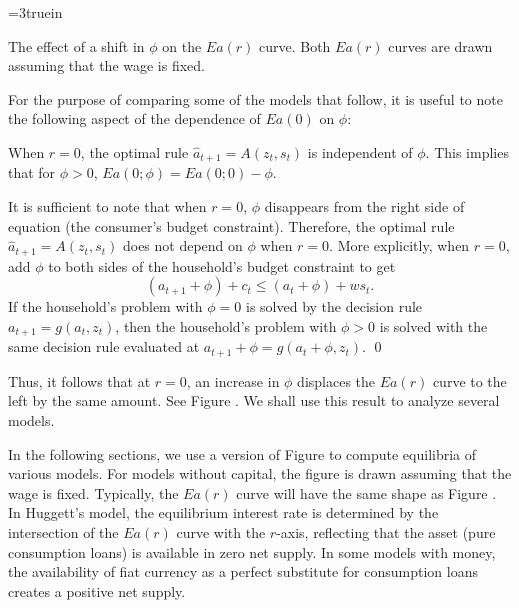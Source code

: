 \medskip


\centerline{\epsfxsize=3truein}
\caption{The effect of a shift in $\phi$ on the $E a(r)$ curve.  Both $E a(r)$
curves are drawn assuming that the wage is fixed.}
\endfigure


For the purpose of comparing some of the models that follow, it is useful to note
the following aspect of the dependence of
$E a(0)$ on $\phi$:

\medskip
\medskip{} When $r=0$, the optimal rule
$ \hat a_{t+1} = A(z_t,s_t)$
is independent of $\phi$.  This implies that for $\phi >0$, $E a(0;\phi)
   = Ea(0; 0) - \phi$.

\medskip
{}  It is sufficient to note that
when $r=0$, $\phi$ disappears  from the right side of equation
 (the consumer's budget constraint).
  Therefore, the optimal rule
$\hat a_{t+1} = A(z_t,s_t)$ does not depend on $\phi$ when
$r=0$.  More explicitly,  when $r=0$, add $\phi$ to both sides
of the household's budget constraint to get
$$(a_{t+1} + \phi)  + c_t \leq (a_t+ \phi) + w s_t .$$
If the household's problem with $\phi=0$ is solved by the decision rule
$a_{t+1} = g(a_t, z_t)$, then the household's problem
with $\phi >0$ is solved with the same decision rule
evaluated at $a_{t+1} +\phi = g(a_t +\phi, z_t)$. \qed

\smallskip

Thus, it follows that at $r=0$, an increase in $\phi$ displaces the
$Ea(r)$ curve to the left by the same amount. See Figure .
We shall use this
result to analyze several models.

In the following sections, we use a version of Figure  to compute equilibria
of various models.  For models without capital, the figure is drawn
assuming that the wage is fixed.  Typically, the $E a(r)$ curve will have the
same shape as Figure .  In Huggett's model, the equilibrium interest rate
is determined by the intersection of the $Ea(r)$ curve with the $r$-axis,
reflecting that the asset (pure consumption loans) is available in zero
net supply.  In some models with money, the availability of fiat currency as  a perfect substitute
for consumption loans  creates a positive net supply.

